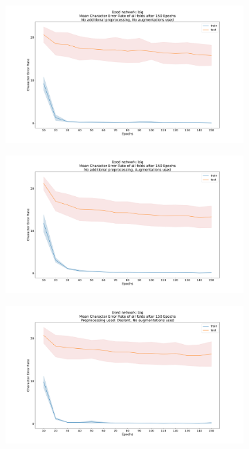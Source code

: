 \documentclass{article}
\begin{document}
\begin{figure}[H]
	\begin{adjustwidth}{-8em}{-8em}
	\centering
    \begin{subfigure}{0.7\textwidth}
        \centering
        \includegraphics[width=\textwidth]{Standard_big_150_cer}
    \end{subfigure}
    \begin{subfigure}{0.7\textwidth}
        \centering
        \includegraphics[width=\textwidth]{Standard_big_150_augmentations_cer}
    \end{subfigure}
    \begin{subfigure}{0.7\textwidth}
        \centering
        \includegraphics[width=\textwidth]{Deslant_big_150_cer}

\end{subfigure}
\end{adjustwidth}
\end{figure}
\end{document}
